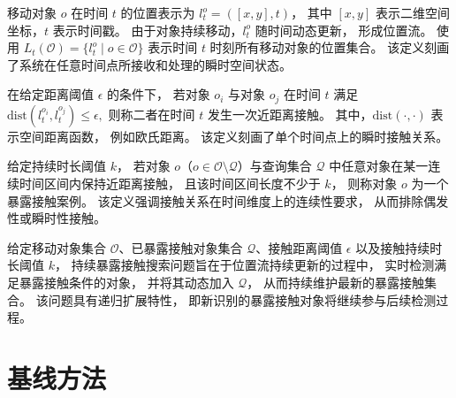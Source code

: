 \begin{definition}[移动对象的位置流]
移动对象 $o$ 在时间 $t$ 的位置表示为 $l_t^o=([x,y],t)$， 其中 $[x,y]$ 表示二维空间坐标，$t$ 表示时间戳。 由于对象持续移动，$l_t^o$ 随时间动态更新， 形成位置流。 使用 $L_t(\mathcal{O})=\{l_t^o \mid o\in \mathcal{O}\}$ 表示时间 $t$ 时刻所有移动对象的位置集合。 该定义刻画了系统在任意时间点所接收和处理的瞬时空间状态。
\end{definition}

\begin{definition}[近距离接触]
在给定距离阈值 $\epsilon$ 的条件下， 若对象 $o_i$ 与对象 $o_j$ 在时间 $t$ 满足
$
\mathrm{dist}(l_t^{o_i}, l_t^{o_j}) \le \epsilon,
$
则称二者在时间 $t$ 发生一次近距离接触。 其中，$\mathrm{dist}(\cdot,\cdot)$ 表示空间距离函数， 例如欧氏距离。 该定义刻画了单个时间点上的瞬时接触关系。
\end{definition}

\begin{definition}[暴露接触案例]
给定持续时长阈值 $k$， 若对象 $o$（$o \in \mathcal{O} \setminus \mathcal{Q}$）与查询集合 $\mathcal{Q}$ 中任意对象在某一连续时间区间内保持近距离接触， 且该时间区间长度不少于 $k$， 则称对象 $o$ 为一个暴露接触案例。 该定义强调接触关系在时间维度上的连续性要求， 从而排除偶发性或瞬时性接触。
\end{definition}

\begin{definition}[持续暴露接触搜索问题]
给定移动对象集合 $\mathcal{O}$、已暴露接触对象集合 $\mathcal{Q}$、接触距离阈值 $\epsilon$ 以及接触持续时长阈值 $k$， 持续暴露接触搜索问题旨在于位置流持续更新的过程中， 实时检测满足暴露接触条件的对象， 并将其动态加入 $\mathcal{Q}$， 从而持续维护最新的暴露接触集合。 该问题具有递归扩展特性， 即新识别的暴露接触对象将继续参与后续检测过程。
\end{definition}
\section{基线方法}


